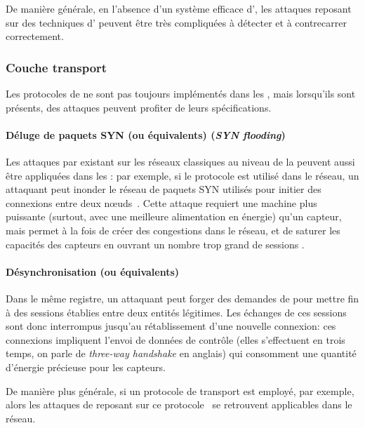 De manière générale, en l'absence d'un système efficace d', les attaques reposant sur des techniques d' peuvent être très compliquées à détecter et à contrecarrer correctement.

    \subsubsection{Couche transport}
Les protocoles de  ne sont pas toujours implémentés dans les \rcsfs, mais lorsqu'ils sont présents, des attaques peuvent profiter de leurs spécifications.

        \paragraph{Déluge de paquets SYN (ou équivalents) (\textit{SYN flooding})}
Les attaques par \dds existant sur les réseaux classiques au niveau de la  peuvent aussi être appliquées dans les \rcs: par exemple, si le protocole \tcp est utilisé dans le réseau, un attaquant peut inonder le réseau de paquets SYN utilisés pour initier des connexions entre deux nœuds~\cite{AD14}.
Cette attaque requiert une machine plus puissante (surtout, avec une meilleure alimentation en énergie) qu'un capteur, mais permet à la fois de créer des congestions dans le réseau, et de saturer les capacités des capteurs en ouvrant un nombre trop grand de sessions \tcp.

\paragraph{Désynchronisation \tcp (ou équivalents)}
Dans le même registre, un attaquant peut forger des demandes de \desync pour mettre fin à des sessions \tcp établies entre deux entités légitimes.
Les échanges de ces sessions sont donc interrompus jusqu'au rétablissement d'une nouvelle connexion: ces connexions impliquent l'envoi de données de contrôle (elles s'effectuent en trois temps, on parle de \textit{three-way handshake} en anglais) qui consomment une quantité d'énergie précieuse pour les capteurs.

De manière plus générale, si un protocole de transport est employé, \tcp par exemple, alors les attaques de \dds reposant sur ce protocole~\cite{tcpsec} se retrouvent applicables dans le réseau.

